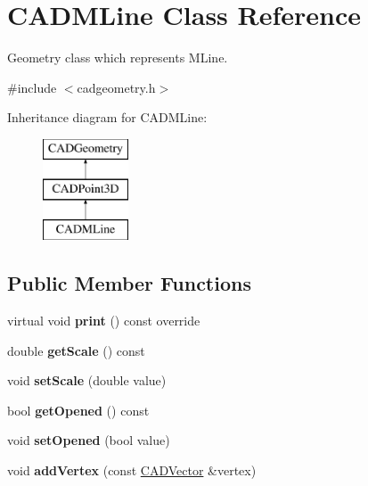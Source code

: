 \hypertarget{class_c_a_d_m_line}{}\section{C\+A\+D\+M\+Line Class Reference}
\label{class_c_a_d_m_line}


Geometry class which represents M\+Line.  




{\ttfamily \#include $<$cadgeometry.\+h$>$}

Inheritance diagram for C\+A\+D\+M\+Line\+:\begin{figure}[H]
\begin{center}
\leavevmode
\includegraphics[height=3.000000cm]{class_c_a_d_m_line}
\end{center}
\end{figure}
\subsection*{Public Member Functions}
\begin{DoxyCompactItemize}
\item 
virtual void {\bfseries print} () const  override\hypertarget{class_c_a_d_m_line_a13ddedaa98d8c2053b2b12be667d3450}{}\label{class_c_a_d_m_line_a13ddedaa98d8c2053b2b12be667d3450}

\item 
double {\bfseries get\+Scale} () const \hypertarget{class_c_a_d_m_line_a52a332e9d00ca717e1e2c4130a0e9feb}{}\label{class_c_a_d_m_line_a52a332e9d00ca717e1e2c4130a0e9feb}

\item 
void {\bfseries set\+Scale} (double value)\hypertarget{class_c_a_d_m_line_ae90f0223a4d84afa9cae119fd2f3e3a5}{}\label{class_c_a_d_m_line_ae90f0223a4d84afa9cae119fd2f3e3a5}

\item 
bool {\bfseries get\+Opened} () const \hypertarget{class_c_a_d_m_line_a8be6f8dd9a356e6299d05ace4d2e04ce}{}\label{class_c_a_d_m_line_a8be6f8dd9a356e6299d05ace4d2e04ce}

\item 
void {\bfseries set\+Opened} (bool value)\hypertarget{class_c_a_d_m_line_a9e14ff4b617a4ff66cdff7b107cfac26}{}\label{class_c_a_d_m_line_a9e14ff4b617a4ff66cdff7b107cfac26}

\item 
void {\bfseries add\+Vertex} (const \hyperlink{class_c_a_d_vector}{C\+A\+D\+Vector} \&vertex)\hypertarget{class_c_a_d_m_line_a2c9da2a7ddba096709742750c143cb1d}{}\label{class_c_a_d_m_line_a2c9da2a7ddba096709742750c143cb1d}

\end{DoxyCompactItemize}
